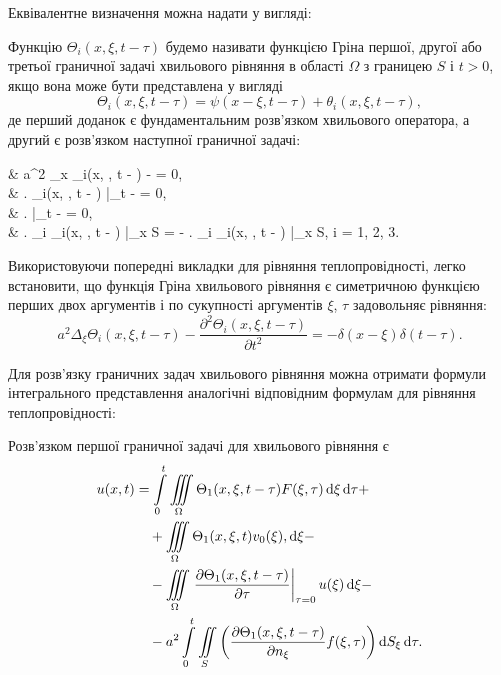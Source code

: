 Еквівалентне визначення можна надати у вигляді:
\begin{definition}
	Функцію $\Theta_i(x, \xi, t - \tau)$ будемо називати функцією Гріна першої, другої або третьої граничної задачі хвильового рівняння в області $\Omega$ з границею $S$ і $t > 0$, якщо вона може бути представлена у вигляді
	\begin{equation}
		\Theta_i(x, \xi, t - \tau) = \psi(x - \xi, t - \tau) + \theta_i(x, \xi, t - \tau),
	\end{equation}
	де перший доданок є фундаментальним розв'язком хвильового оператора, а другий є розв'язком наступної граничної задачі:
	\begin{system}
		& a^2 \Delta_x \theta_i(x, \xi, t - \tau) -  = 0, \\
		& \left. \theta_i(x, \xi, t - \tau) \right|_{t - \tau {}} = 0, \\
		& \left.  \right|_{t - \tau {}} = 0, \\
		& \left. \ell_i \theta_i(x, \xi, t - \tau) \right|_{x \in S} = - \left. \ell_i \psi_i(x, \xi, t - \tau) \right|_{x \in S}, \quad i = 1, 2, 3.
	\end{system}
\end{definition}

Використовуючи попередні викладки для рівняння теплопровідності, легко встановити, що функція Гріна хвильового рівняння є симетричною функцією перших двох аргументів і по сукупності аргументів $\xi$, $\tau$ задовольняє рівняння:
\begin{equation}
	a^2 \Delta_\xi \Theta_i(x, \xi, t - \tau) - \frac{\partial^2 \Theta_i(x, \xi, t - \tau)}{\partial t^2} = - \delta(x - \xi) \delta(t - \tau).
\end{equation}

Для розв'язку граничних задач хвильового рівняння можна отримати формули інтегрального представлення аналогічні відповідним формулам для рівняння теплопровідності:
\begin{th_formula}
	Розв'язком першої граничної задачі для хвильового рівняння є 
	\begin{equation}
		\begin{aligned}
			u(x, t) &= \displaystyle\int\limits_0^t \displaystyle\iiint\limits_\Omega \Theta_1(x, \xi, t - \tau) F(\xi, \tau) \mathop{}\!\mathrm{d} \xi \mathop{}\!\mathrm{d} \tau + \\
			& \quad + \displaystyle\iiint\limits_\Omega \Theta_1(x, \xi, t) v_0(\xi), \mathop{}\!\mathrm{d} \xi - \\
			& \quad - \displaystyle\iiint\limits_\Omega \left. \frac{\partial \Theta_1(x, \xi, t - \tau)}{\partial \tau} \right|_{\tau = 0} u(\xi) \mathop{}\!\mathrm{d} \xi - \\
			& \quad - a^2 \displaystyle\int\limits_0^t \displaystyle\iint\limits_S \left( \frac{\partial \Theta_1(x, \xi, t - \tau)}{\partial n_\xi} f(\xi, \tau) \right) \mathop{}\!\mathrm{d} S_\xi \mathop{}\!\mathrm{d} \tau.
		\end{aligned}
	\end{equation}
\end{th_formula}

